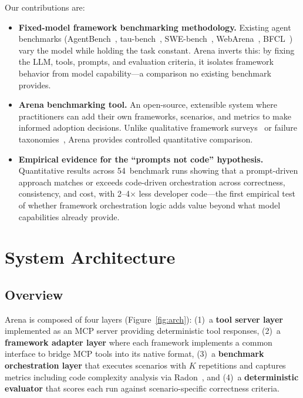 \documentclass[sigconf]{acmart}
\begin{document}
Our contributions are:
\begin{itemize}[leftmargin=*,nosep]
  \item \textbf{Fixed-model framework benchmarking methodology.} Existing agent benchmarks (AgentBench~\cite{agentbench}, tau-bench~\cite{taubench}, SWE-bench~\cite{swebench}, WebArena~\cite{webarena}, BFCL~\cite{bfcl}) vary the model while holding the task constant. Arena inverts this: by fixing the LLM, tools, prompts, and evaluation criteria, it isolates framework behavior from model capability---a comparison no existing benchmark provides.
  \item \textbf{Arena benchmarking tool.} An open-source, extensible system where practitioners can add their own frameworks, scenarios, and metrics to make informed adoption decisions. Unlike qualitative framework surveys~\cite{masterman} or failure taxonomies~\cite{cemri}, Arena provides controlled quantitative comparison.
  \item \textbf{Empirical evidence for the ``prompts not code'' hypothesis.} Quantitative results across 54~benchmark runs showing that a prompt-driven approach matches or exceeds code-driven orchestration across correctness, consistency, and cost, with 2--4$\times$ less developer code---the first empirical test of whether framework orchestration logic adds value beyond what model capabilities already provide.
\end{itemize}

\section{System Architecture}

\subsection{Overview}

Arena is composed of four layers (Figure~\ref{fig:arch}): (1)~a \textbf{tool server layer} implemented as an MCP server providing deterministic tool responses, (2)~a \textbf{framework adapter layer} where each framework implements a common interface to bridge MCP tools into its native format, (3)~a \textbf{benchmark orchestration layer} that executes scenarios with $K$ repetitions and captures metrics including code complexity analysis via Radon~\cite{radon}, and (4)~a \textbf{deterministic evaluator} that scores each run against scenario-specific correctness criteria.
\end{document}
